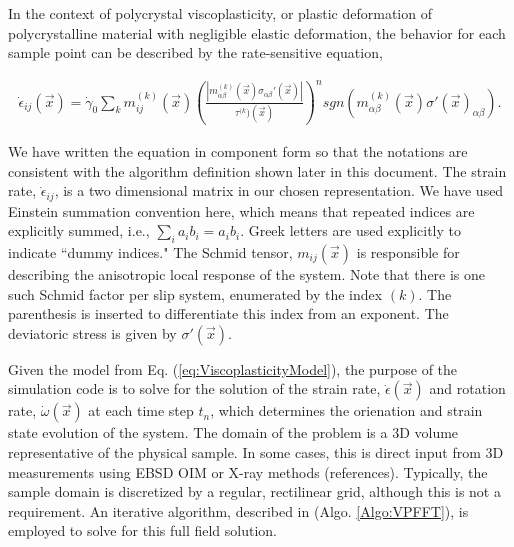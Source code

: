 \documentclass[11pt]{article}
\newcommand{\RefEq}[1] {Eq. (\ref{#1})}
\newcommand{\RefAlgo}[1]{Algo. \ref{#1}}
\begin{document}
In the context of polycrystal viscoplasticity, or plastic deformation of polycrystalline material with negligible elastic deformation, the behavior for each sample point can be described by the rate-sensitive equation,

\begin{eqnarray}
\dot{ \epsilon }_{ij} \left( \vec{x} \right) = \dot{ \gamma }_0 \sum_{k} m_{ij}^{(k)}( \vec{x}) 
\left(
\frac{|m^{(k)}_{\alpha \beta }(\vec{x}) \sigma_{\alpha \beta} '(\vec{x}) |}{\tau^{(k})(\vec{x}) }
 \right )^n
sgn \left( m^{(k)}_{\alpha \beta}(\vec{x}) \sigma'(\vec{x})_{\alpha \beta} \right).
\label{eq:ViscoplasticityModel}
\end{eqnarray}

We have written the equation in component form so that the notations are consistent with the algorithm definition shown later in this document.  The strain rate, $\dot{\epsilon}_{ij}$, is a two dimensional matrix in our chosen representation.  We have used Einstein summation convention here, which means that repeated indices are explicitly summed, i.e., $\sum_i a_i b_i = a_i b_i$.  Greek letters are used explicitly to indicate ``dummy indices."  The Schmid tensor, $m_{ij}(\vec{x})$ is responsible for describing the anisotropic local response of the system.  Note that there is one such Schmid factor per slip system, enumerated by the index $(k)$.  The parenthesis is inserted to differentiate this index from an exponent.  The deviatoric stress is given by $\sigma'(\vec{x})$.

Given the model from \RefEq{eq:ViscoplasticityModel}, the purpose of the simulation code is to solve for the solution of the strain rate, $\dot{\epsilon}(\vec{x})$ and rotation rate, $\dot{\omega}(\vec{x})$ at each time step $t_n$, which determines the orienation and strain state evolution of the system.  The domain of the problem is a 3D volume representative of the physical sample.  In some cases, this is direct input from 3D measurements using EBSD OIM or X-ray methods (references).  Typically, the sample domain is discretized by a regular, rectilinear grid, although this is not a requirement.  An iterative algorithm, described in  (\RefAlgo{Algo:VPFFT}), is employed to solve for this full field solution. 

\end{document}

